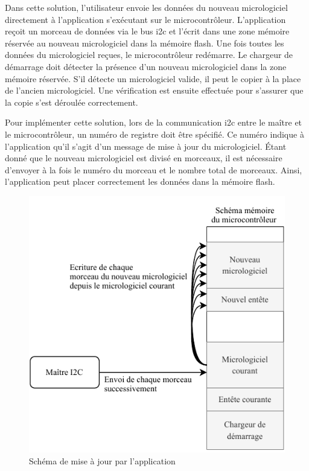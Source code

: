 Dans cette solution, l'utilisateur envoie les données du nouveau micrologiciel directement à l'application s'exécutant sur le microcontrôleur.
L'application reçoit un morceau de données via le bus \gls{i2c} et l'écrit dans une zone mémoire réservée au nouveau micrologiciel dans la mémoire flash.
Une fois toutes les données du micrologiciel reçues, le microcontrôleur redémarre.
Le chargeur de démarrage doit détecter la présence d'un nouveau micrologiciel dans la zone mémoire réservée.
S'il détecte un micrologiciel valide, il peut le copier à la place de l'ancien micrologiciel.
Une vérification est ensuite effectuée pour s'assurer que la copie s'est déroulée correctement.

Pour implémenter cette solution, lors de la communication \gls{i2c} entre le maître et le microcontrôleur, un numéro de registre doit être spécifié.
Ce numéro indique à l'application qu'il s'agit d'un message de mise à jour du micrologiciel.
Étant donné que le nouveau micrologiciel est divisé en morceaux, il est nécessaire d'envoyer à la fois le numéro du morceau et le nombre total de morceaux.
Ainsi, l'application peut placer correctement les données dans la mémoire flash.

\begin{figure}[H]
    \centering
    \includegraphics[scale=1.3]{./assets/figures/firmware_update.pdf}
    \caption{Schéma de mise à jour par l'application}
\end{figure}

